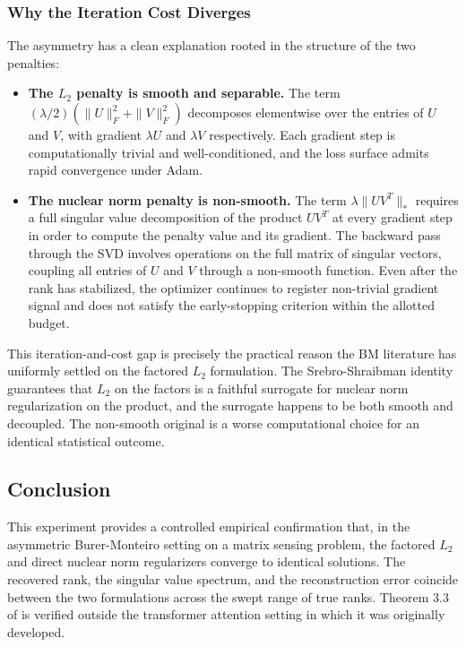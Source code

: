 \subsubsection{Why the Iteration Cost Diverges}
The asymmetry has a clean explanation rooted in the structure of the two penalties:

\begin{itemize}
    \item \textbf{The $L_2$ penalty is smooth and separable.} The term $(\lambda/2)(\|U\|_F^2 + \|V\|_F^2)$ decomposes elementwise over the entries of $U$ and $V$, with gradient $\lambda U$ and $\lambda V$ respectively. Each gradient step is computationally trivial and well-conditioned, and the loss surface admits rapid convergence under Adam.
    \item \textbf{The nuclear norm penalty is non-smooth.} The term $\lambda \|UV^T\|_*$ requires a full singular value decomposition of the product $UV^T$ at every gradient step in order to compute the penalty value and its gradient. The backward pass through the SVD involves operations on the full matrix of singular vectors, coupling all entries of $U$ and $V$ through a non-smooth function. Even after the rank has stabilized, the optimizer continues to register non-trivial gradient signal and does not satisfy the early-stopping criterion within the allotted budget.

\end{itemize}

This iteration-and-cost gap is precisely the practical reason the BM literature has uniformly settled on the factored $L_2$ formulation. The Srebro-Shraibman identity guarantees that $L_2$ on the factors is a faithful surrogate for nuclear norm regularization on the product, and the surrogate happens to be both smooth and decoupled. The non-smooth original is a worse computational choice for an identical statistical outcome.

\subsection{Conclusion}
This experiment provides a controlled empirical confirmation that, in the asymmetric Burer-Monteiro setting on a matrix sensing problem, the factored $L_2$ and direct nuclear norm regularizers converge to identical solutions. The recovered rank, the singular value spectrum, and the reconstruction error coincide between the two formulations across the swept range of true ranks. Theorem 3.3 of \cite{kobayashi2024lowrank} is verified outside the transformer attention setting in which it was originally developed.

